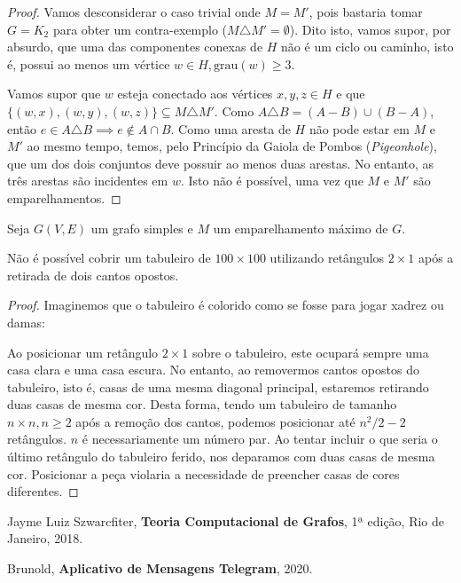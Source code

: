 \documentclass{homework}
\begin{document}
	\begin{proof}
	Vamos desconsiderar o caso trivial onde $M = M'$, pois bastaria tomar $G = K_2$ para obter um contra-exemplo ($M \triangle M' = \emptyset$). Dito isto, vamos supor, por absurdo, que uma das componentes conexas de $H$ não é um ciclo ou caminho, isto é, possui ao menos um vértice $w \in H, \text{grau}(w) \ge 3$.
	
	\begin{fig}
		
	\end{fig}

	Vamos supor que $w$ esteja conectado aos vértices $x, y, z \in H$ e que $\{(w, x), (w, y), (w, z)\} \subseteq M \triangle M'$. Como $A \triangle B = (A - B) \cup (B - A)$, então $e \in A \triangle B \implies e \notin A \cap B$. Como uma aresta de $H$ não pode estar em $M$ e $M'$ ao mesmo tempo, temos, pelo Princípio da Gaiola de Pombos (\textit{Pigeonhole}), que um dos dois conjuntos deve possuir ao menos duas arestas. No entanto, as três arestas são incidentes em $w$. Isto não é possível, uma vez que $M$ e $M'$ são emparelhamentos.
	\end{proof}
	
	\quest %
	
	Seja $G(V, E)$ um grafo simples e $M$ um emparelhamento máximo de $G$.	
	
	\quest %
	
	\begin{supposition}
		Não é possível cobrir um tabuleiro de $100 \times 100$ utilizando retângulos $2 \times 1$ após a retirada de dois cantos opostos.
	\end{supposition}

	\begin{proof}
		Imaginemos que o tabuleiro é colorido como se fosse para jogar xadrez ou damas:
		\begin{fig}
			
		\end{fig}
		Ao posicionar um retângulo $2 \times 1$ sobre o tabuleiro, este ocupará sempre uma casa clara e uma casa escura. No entanto, ao removermos cantos opostos do tabuleiro, isto é, casas de uma mesma diagonal principal, estaremos retirando duas casas de mesma cor. Desta forma, tendo um tabuleiro de tamanho $n \times n, n \ge 2$ após a remoção dos cantos, podemos posicionar até $n^2 / 2 - 2$ retângulos. $n$ é necessariamente um número par. Ao tentar incluir o que seria o último retângulo do tabuleiro ferido, nos deparamos com duas casas de mesma cor. Posicionar a peça violaria a necessidade de preencher casas de cores diferentes.
	\end{proof}
	
	
	
	\begin{thebibliography}{10}
		 Jayme Luiz Szwarcfiter, \textbf{Teoria Computacional de Grafos}, 1ª edição, Rio de Janeiro, 2018.
		
		 Brunold, \textbf{Aplicativo de Mensagens Telegram}, 2020.
	\end{thebibliography}
\end{document}
